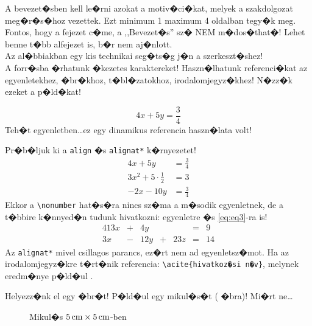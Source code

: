 \label{Chap:bevezetes}
\iffalse
A bevezet�sben kell le�rni azokat a motiv�ci�kat, melyek a szakdolgozat meg�r�s�hoz vezettek. Ezt minimum 1 maximum 4 oldalban tegy�k meg. Fontos, hogy a fejezet c�me, a ,,Bevezet�s'' sz� NEM m�dos�that�! Lehet benne t�bb alfejezet is, b�r nem aj�nlott.\\

Az al�bbiakban egy kis technikai seg�ts�g j�n a szerkeszt�shez!\\

A forr�sba �rhatunk �kezetes karaktereket! Haszn�lhatunk referenci�kat az egyenletekhez, �br�khoz, t�bl�zatokhoz, irodalomjegyz�khez! N�zz�k ezeket a p�ld�kat!


\begin{equation}
4x+5y=\frac{3}{4}
\label{eq:eq1}
\end{equation}
Teh�t  egyenletben\ldots ez egy dinamikus referencia haszn�lata volt!

Pr�b�ljuk ki a \verb|align| �s \verb|alignat*| k�rnyezetet!
\begin{align}
4x+5y&=\frac{3}{4}\label{eq:eq2}\\
3x^2+5\cdot\frac{1}{2}&=3\nonumber\\
-2x-10y&=\frac{3}{4}\label{eq:eq3}
\end{align}
Ekkor a \verb|\nonumber| hat�s�ra nincs sz�ma a m�sodik egyenletnek, de a t�bbire k�nnyed�n tudunk hivatkozni:
 egyenletre �s \ref{eq:eq3}-ra is!
\begin{alignat*}{4}
  13x &+{} &  4y &    &     & ={} & 9\\
   3x &-{} & 12y &+{} & 23z & ={} &14
\end{alignat*}
Az \verb|alignat*| mivel csillagos parancs, ez�rt nem ad egyenletsz�mot. Ha az irodalomjegyz�kre t�rt�nik referencia:
\verb|\acite{hivatkoz�si n�v}|, melynek eredm�nye p�ld�ul .

\label{Sec:abrak}

Helyezz�nk el egy �br�t! P�ld�ul egy mikul�s�t ( �bra)! Mi�rt ne\ldots
\begin{figure}[ht]
\centering
{}
\caption{Mikul�s $5\mbox{\,cm}\times 5\mbox{\,cm}$-ben}
\label{fig:mikulas}
\end{figure}

\newpage

